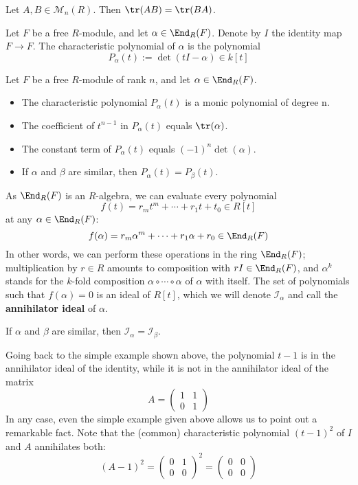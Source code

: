 \begin{lemma}
Let $A,B\in\mathcal{M}_n(R)$. Then $\tr(AB)=\tr(BA)$.
\end{lemma}
\begin{definition}
Let $F$ be a free $R$-module, and let $\alpha\in\End_R(F)$. Denote by $I$ the identity map $F\to F$. The characteristic polynomial of $\alpha$ is the polynomial
\[P_\alpha(t):=\det(tI-\alpha)\in k[t]\]
\end{definition}
\begin{proposition}
Let $F$ be a free $R$-module of rank $n$, and let $\alpha\in\End_R(F)$.
\begin{itemize}
\item The characteristic polynomial $P_\alpha(t)$ is a monic polynomial of degree n.
\item The coefficient of $t^{n-1}$ in $P_\alpha(t)$ equals $\tr(\alpha)$.
\item The constant term of $P_\alpha(t)$ equals $(-1)^n\det(\alpha)$.
\item If $\alpha$ and $\beta$ are similar, then $P_\alpha(t)=P_\beta(t)$.
\end{itemize}
\end{proposition}
As $\End_R(F)$ is an $R$-algebra, we can evaluate every polynomial
\[f(t)=r_mt^m+\cdots+r_1t+t_0\in R[t]\]
at any $\alpha\in\End_R(F)$:
\[f(\alpha)=r_m\alpha^m+\cdots+r_1\alpha+r_0\in\End_R(F)\]
In other words, we can perform these operations in the ring $\End_R(F)$; multiplication by $r\in R$ amounts to composition with $rI\in\End_R(F)$, and $\alpha^k$ stands for the $k$-fold composition $\alpha\circ\cdots\circ\alpha$ of $\alpha$ with itself. The set of polynomials such that $f(\alpha)=0$ is an ideal of $R[t]$, which we will denote $\mathscr{I}_\alpha$ and call the \textbf{annihilator ideal} of $\alpha$.
\begin{lemma}
If $\alpha$ and $\beta$ are similar, then $\mathscr{I}_\alpha=\mathscr{I}_\beta$.
\end{lemma}
Going back to the simple example shown above, the polynomial $t-1$ is in the annihilator ideal of the identity, while it is not in the annihilator ideal of the matrix
\[A=\begin{pmatrix}
1&1\\
0&1
\end{pmatrix}\]
In any case, even the simple example given above allows us to point out a remarkable fact. Note that the (common) characteristic polynomial $(t-1)^2$ of $I$ and $A$ annihilates both:
\[(A-1)^2=\begin{pmatrix}
0&1\\
0&0
\end{pmatrix}^2=\begin{pmatrix}
0&0\\
0&0
\end{pmatrix}\]
